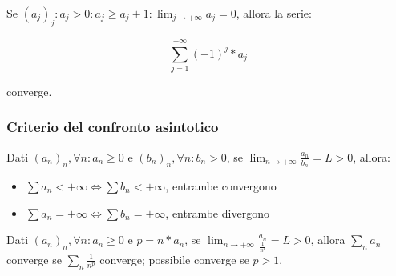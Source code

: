 \documentclass{subfiles}
\begin{document}
Se $(a_j)_j : a_j > 0 : a_j \geq a_j + 1 : \lim_{j \to +\infty} a_j = 0$, allora la serie:

$$
\sum_{j = 1}^{+\infty} (-1)^j * a_j
$$

\noindent
converge.

\subsubsection{Criterio del confronto asintotico}

Dati $(a_n)_n, \forall n : a_n \geq 0$ e $(b_n)_n, \forall n : b_n > 0$, se $\lim_{n \to +\infty} \frac{a_n}{b_n} = L > 0$, allora:

\begin{itemize}
    \item $\sum a_n < +\infty \Leftrightarrow \sum b_n < +\infty$, entrambe convergono
    \item $\sum a_n = +\infty \Leftrightarrow \sum b_n = +\infty$, entrambe divergono
\end{itemize}

\noindent
Dati $(a_n)_n, \forall n : a_n \geq 0$ e $p = n * a_n$, se $\lim_{n \to +\infty} \frac{a_n}{\frac{1}{n^p}} = L > 0$, allora $\sum_{n} a_n$ converge se $\sum_{n}^{} \frac{1}{n^p}$ converge; possibile converge se $p > 1$.
\end{document}

